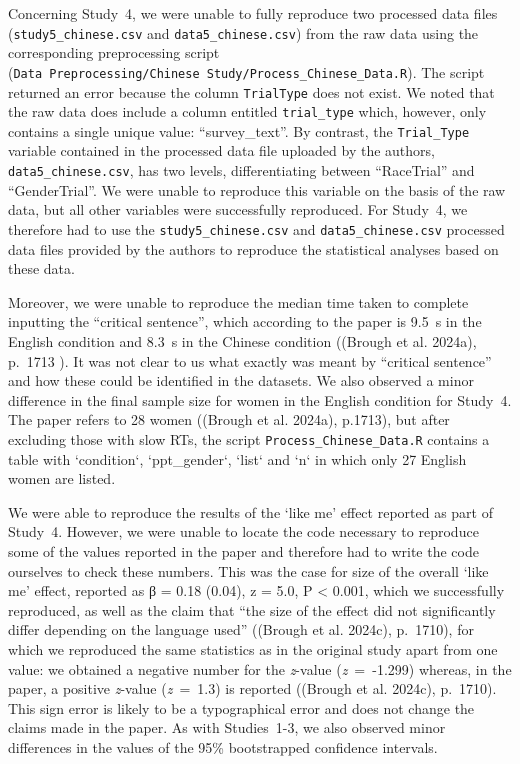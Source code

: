 \documentclass[
  letterpaper,
  DIV=11,
  numbers=noendperiod]{scrartcl}
\begin{document}
Concerning Study~4, we were unable to fully reproduce two processed data
files (\texttt{study5\_chinese.csv} and \texttt{data5\_chinese.csv})
from the raw data using the corresponding preprocessing script
(\texttt{Data\ Preprocessing/Chinese\ Study/Process\_Chinese\_Data.R}).
The script returned an error because the column \texttt{TrialType} does
not exist. We noted that the raw data does include a column entitled
\texttt{trial\_type} which, however, only contains a single unique
value: ``survey\_text''. By contrast, the \texttt{Trial\_Type} variable
contained in the processed data file uploaded by the authors,
\texttt{data5\_chinese.csv}, has two levels, differentiating between
``RaceTrial'' and ``GenderTrial''. We were unable to reproduce this
variable on the basis of the raw data, but all other variables were
successfully reproduced. For Study~4, we therefore had to use the
\texttt{study5\_chinese.csv} and \texttt{data5\_chinese.csv} processed
data files provided by the authors to reproduce the statistical analyses
based on these data.~

Moreover, we were unable to reproduce the median time taken to complete
inputting the ``critical sentence'', which according to the paper is
9.5~s in the English condition and 8.3~s in the Chinese condition
((Brough et al. 2024a), p.~1713 ). It was not clear to us what exactly
was meant by ``critical sentence'' and how these could be identified in
the datasets. We also observed a minor difference in the final sample
size for women in the English condition for Study~4. The paper refers to
28 women ((Brough et al. 2024a), p.1713), but after excluding those with
slow RTs, the script \texttt{Process\_Chinese\_Data.R} contains a table
with `condition`, `ppt\_gender`, `list` and `n` in which only 27 English
women are listed.

We were able to reproduce the results of the `like me' effect reported
as part of Study~4. However, we were unable to locate the code necessary
to reproduce some of the values reported in the paper and therefore had
to write the code ourselves to check these numbers. This was the case
for size of the overall `like me' effect, reported as β = 0.18 (0.04), z
= 5.0, P \textless{} 0.001, which we successfully reproduced, as well as
the claim that ``the size of the effect did not significantly differ
depending on the language used'' ((Brough et al. 2024c), p.~1710), for
which we reproduced the same statistics as in the original study apart
from one value: we obtained a negative number for the \emph{z}-value
(\emph{z}~=~-1.299) whereas, in the paper, a positive \emph{z}-value
(\emph{z}~=~1.3) is reported ((Brough et al. 2024c), p.~1710). This sign
error is likely to be a typographical error and does not change the
claims made in the paper. As with Studies~1-3, we also observed minor
differences in the values of the 95\% bootstrapped confidence
intervals.~
\end{document}

